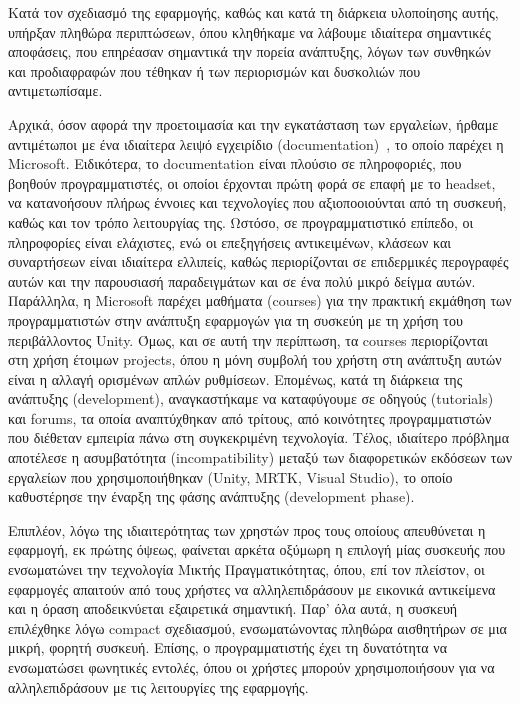Κατά τον σχεδιασμό της εφαρμογής, καθώς και κατά τη διάρκεια υλοποίησης αυτής, υπήρξαν πληθώρα περιπτώσεων, όπου κληθήκαμε να λάβουμε ιδιαίτερα σημαντικές αποφάσεις, που επηρέασαν σημαντικά την πορεία ανάπτυξης, λόγων των συνθηκών και προδιαφραφών που τέθηκαν ή των περιορισμών και δυσκολιών που αντιμετωπίσαμε.

Αρχικά, όσον αφορά την προετοιμασία και την εγκατάσταση των εργαλείων, ήρθαμε αντιμέτωποι με ένα ιδιαίτερα λειψό εγχειρίδιο (documentation)~\cite{hferrone_mixed}, το οποίο παρέχει η Microsoft.
Ειδικότερα, το documentation είναι πλούσιο σε πληροφοριές, που βοηθούν προγραμματιστές, οι οποίοι έρχονται πρώτη φορά σε επαφή με το headset, να κατανοήσουν πλήρως έννοιες και τεχνολογίες που αξιοποοιούνται από τη συσκευή, καθώς και τον τρόπο λειτουργίας της. Ωστόσο, σε προγραμματιστικό επίπεδο, οι πληροφορίες είναι ελάχιστες, ενώ οι επεξηγήσεις αντικειμένων, κλάσεων και συναρτήσεων είναι ιδιαίτερα ελλιπείς, καθώς περιορίζονται σε επιδερμικές περογραφές αυτών και την παρουσιασή παραδειγμάτων και σε ένα πολύ μικρό δείγμα αυτών.
Παράλληλα, η Microsoft παρέχει μαθήματα (courses) για την πρακτική εκμάθηση των προγραμματιστών στην ανάπτυξη εφαρμογών για τη συσκεύη με τη χρήση του περιβάλλοντος Unity. Όμως, και σε αυτή την περίπτωση, τα courses περιορίζονται στη χρήση έτοιμων projects, όπου η μόνη συμβολή του χρήστη στη ανάπτυξη αυτών είναι η αλλαγή ορισμένων απλών ρυθμίσεων. Επομένως, κατά τη διάρκεια της ανάπτυξης (development), αναγκαστήκαμε να καταφύγουμε σε οδηγούς (tutorials) και forums, τα οποία αναπτύχθηκαν από τρίτους, από κοινότητες προγραμματιστών που διέθεταν εμπειρία πάνω στη συγκεκριμένη τεχνολογία.
Τέλος, ιδιαίτερο πρόβλημα αποτέλεσε η ασυμβατότητα (incompatibility) μεταξύ των διαφορετικών εκδόσεων των εργαλείων που χρησιμοποιήθηκαν (Unity, MRTK, Visual Studio), το οποίο καθυστέρησε την έναρξη της φάσης ανάπτυξης (development phase).

Επιπλέον, λόγω της ιδιαιτερότητας των χρηστών προς τους οποίους απευθύνεται η εφαρμογή, εκ πρώτης όψεως, φαίνεται αρκέτα οξύμωρη η επιλογή μίας συσκευής που ενσωματώνει την τεχνολογία Μικτής Πραγματικότητας, όπου, επί τον πλείστον, οι εφαρμογές απαιτούν από τους χρήστες να αλληλεπιδράσουν με εικονικά αντικείμενα και η όραση αποδεικνύεται εξαιρετικά σημαντική. Παρ' όλα αυτά, η συσκευή επιλέχθηκε λόγω compact σχεδιασμού, ενσωματώνοντας πληθώρα αισθητήρων σε μια μικρή, φορητή συσκευή. Επίσης, ο προγραμματιστής έχει τη δυνατότητα να ενσωματώσει φωνητικές εντολές, όπου οι χρήστες μπορούν χρησιμοποιήσουν για να αλληλεπιδράσουν με τις λειτουργίες της εφαρμογής.

